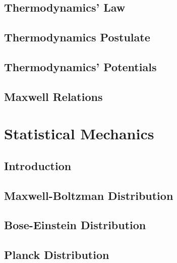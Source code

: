 \documentclass[10pt]{report}
\begin{document}
\section{Thermodynamics' Law}
\clearpage

\section{Thermodynamics Postulate}
\clearpage

\section{Thermodynamics' Potentials}
\clearpage

\section{Maxwell Relations}
\clearpage

\chapter{Statistical Mechanics}\clearpage

\section{Introduction}
\clearpage

\section{Maxwell-Boltzman Distribution}
\clearpage
\clearpage

\section{Bose-Einstein Distribution}
\clearpage

\section{Planck Distribution}
\clearpage
\end{document}
